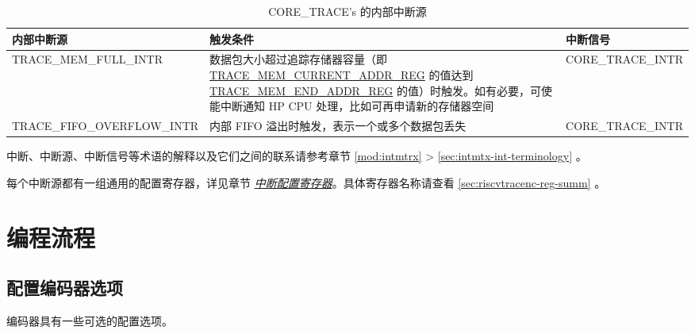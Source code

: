 \documentclass[main\_\_CN.tex]{subfiles}
\begin{document}
\begin{longtable}{ | L{5cm} | L{7cm} | L{3.5cm} | }
\caption{CORE\_TRACE's 的内部中断源} \label{tab:riscvtracenc-int-sources}
\\ \hline
{}
\textbf{内部中断源} & \textbf{触发条件}  &  \textbf{中断信号}\\ \hline

TRACE\_MEM\_FULL\_INTR & 数据包大小超过追踪存储器容量（即 \hyperref[regdesc:TRACEMEMCURRENTADDRREG]{TRACE\_MEM\_CURRENT\_ADDR\_REG} 的值达到 \hyperref[regdesc:TRACEMEMENDADDRREG]{TRACE\_MEM\_END\_ADDR\_REG} 的值）时触发。如有必要，可使能中断通知 HP CPU 处理，比如可再申请新的存储器空间 & CORE\_TRACE\_INTR \\\hline

TRACE\_FIFO\_OVERFLOW\_INTR & 内部 FIFO 溢出时触发，表示一个或多个数据包丢失 & CORE\_TRACE\_INTR \\\hline

\end{longtable}

\begin{tiplisting}
中断、中断源、中断信号等术语的解释以及它们之间的联系请参考章节 \ref{mod:intmtrx} \textit{} > \ref{sec:intmtx-int-terminology} \textit{}。
\end{tiplisting}

每个中断源都有一组通用的配置寄存器，详见章节 \hyperref[interrupt-config-registers]{\textit{中断配置寄存器}}。具体寄存器名称请查看 \ref{sec:riscvtracenc-reg-summ} \textit{}。



\section{编程流程}
\label{sec:riscvtracenc-prog-procedures}

\subsection{配置编码器选项}

编码器具有一些可选的配置选项。
\end{document}
